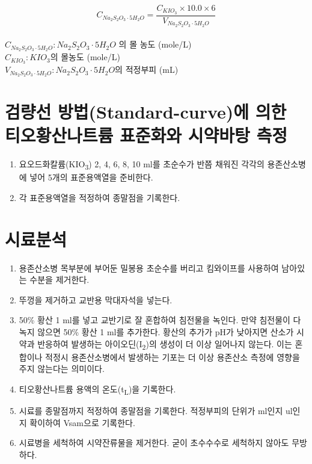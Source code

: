 \documentclass[
]{book}
\providecommand{\tightlist}{%
  \setlength{\itemsep}{0pt}\setlength{\parskip}{0pt}}
\begin{document}
\[C_{Na_{2}S_{2}O_{3} \cdot 5H_{2}O} = \frac{C_{KIO_3} \times 10.0 \times 6}{V_{Na_{2}S_{2}O_{3} \cdot 5H_{2}O}}\]\\
\(C_{Na_{2}S_{2}O_{3} \cdot 5H_{2}O} : Na_{2}S_{2}O_{3} \cdot 5H_{2}O\) 의 몰 농도 (mole/L)\\
\(C_{KIO_3}: KIO_3\)의 몰농도 (mole/L)\\
\(V_{Na_{2}S_{2}O_{3} \cdot 5H_{2}O}: Na_{2}S_{2}O_{3} \cdot 5H_{2}O\)의 적정부피 (mL)

\hypertarget{uxac80uxb7c9uxc120-uxbc29uxbc95standard-curveuxc5d0-uxc758uxd55c-uxd2f0uxc624uxd669uxc0b0uxb098uxd2b8uxb968-uxd45cuxc900uxd654uxc640-uxc2dcuxc57duxbc14uxd0d5-uxce21uxc815}{%
\section{검량선 방법(Standard-curve)에 의한 티오황산나트륨 표준화와 시약바탕 측정}\label{uxac80uxb7c9uxc120-uxbc29uxbc95standard-curveuxc5d0-uxc758uxd55c-uxd2f0uxc624uxd669uxc0b0uxb098uxd2b8uxb968-uxd45cuxc900uxd654uxc640-uxc2dcuxc57duxbc14uxd0d5-uxce21uxc815}}

\begin{enumerate}
\def\labelenumi{\arabic{enumi}.}
\tightlist
\item
  요오드화칼륨(KIO\textsubscript{3}) 2, 4, 6, 8, 10 ml를 초순수가 반쯤 채워진 각각의 용존산소병에 넣어 5개의 표준용액열을 준비한다.
\item
  각 표준용액열을 적정하여 종말점을 기록한다.
\end{enumerate}

\hypertarget{uxc2dcuxb8ccuxbd84uxc11d}{%
\section{시료분석}\label{uxc2dcuxb8ccuxbd84uxc11d}}

\begin{enumerate}
\def\labelenumi{\arabic{enumi}.}
\tightlist
\item
  용존산소병 목부분에 부어둔 밀봉용 초순수를 버리고 킴와이프를 사용하여 남아있는 수분을 제거한다.
\item
  뚜껑을 제거하고 교반용 막대자석을 넣는다.
\item
  50\% 황산 1 ml를 넣고 교반기로 잘 혼합하여 침전물을 녹인다. 만약 침전물이 다 녹지 않으면 50\% 황산 1 ml를 추가한다. 황산의 추가가 pH가 낮아지면 산소가 시약과 반응하여 발생하는 아이오딘(I\textsubscript{2})의 생성이 더 이상 일어나지 않는다. 이는 혼합이나 적정시 용존산소병에서 발생하는 기포는 더 이상 용존산소 측정에 영향을 주지 않는다는 의미이다.
\item
  티오황산나트륨 용액의 온도(t\textsubscript{L})을 기록한다.
\item
  시료를 종말점까지 적정하여 종말점을 기록한다. 적정부피의 단위가 ml인지 ul인지 확이하여 Vsam으로 기록한다.
\item
  시료병을 세척하여 시약잔류물을 제거한다. 굳이 초수수수로 세척하지 않아도 무방하다.
\end{enumerate}
\end{document}
